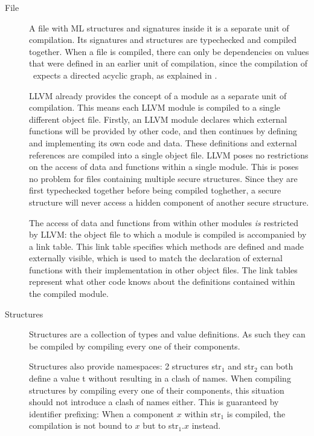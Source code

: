 \begin{description}
\item[File]
A file with ML structures and signatures inside it is a separate unit of compilation.
Its signatures and structures are typechecked and compiled together. 
When a file is compiled, there can only be dependencies on values that were defined in an earlier unit of compilation, since the compilation of \MiniML\ expects a directed acyclic graph, as explained in .

LLVM already provides the concept of a module as a separate unit of compilation.
This means each LLVM module is compiled to a single different object file.
Firstly, an LLVM module declares which external functions will be provided by other code, and then continues by defining and implementing its own code and data.
These definitions and external references are compiled into a single object file.
LLVM poses no restrictions on the access of data and functions within a single module.
This is poses no problem for files containing multiple secure structures. Since they are first typechecked together before being compiled toghether, a secure structure will never access a hidden component of another secure structure.

The access of data and functions from within other modules \emph{is} restricted by LLVM: the object file to which a module is compiled is accompanied by a link table.
This link table specifies which methods are defined and made externally visible, which is used to match the declaration of external functions with their implementation in other object files.
The link tables represent what other code knows about the definitions contained within the compiled module.


\item[Structures]
Structures are a collection of types and value definitions.
As such they can be compiled by compiling every one of their components.

Structures also provide namespaces: 2 structures str$_{1}$ and str$_{2}$ can both define a value t without resulting in a clash of names.
When compiling structures by compiling every one of their components, this situation should not introduce a clash of names either.
This is guaranteed by identifier prefixing: When a component $x$ within str$_{1}$ is compiled, the compilation is not bound to $x$ but to str$_{1}.x$ instead.



\end{description}
